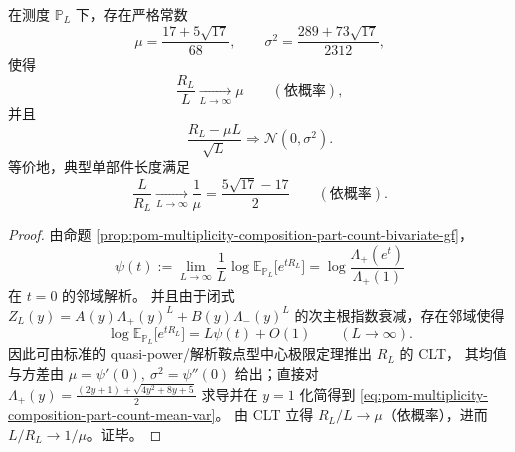 \begin{theorem}\label{thm:pom-multiplicity-composition-part-count-clt}
在测度 \(\mathbb{P}_L\) 下，存在严格常数
\begin{equation}\label{eq:pom-multiplicity-composition-part-count-mean-var}
\mu=\frac{17+5\sqrt{17}}{68},
\qquad
\sigma^2=\frac{289+73\sqrt{17}}{2312},
\end{equation}
使得
\[
\frac{R_L}{L}\xrightarrow[L\to\infty]{}\mu
\qquad(\text{依概率}),
\]
并且
\[
\frac{R_L-\mu L}{\sqrt{L}}\Longrightarrow \mathcal{N}(0,\sigma^2).
\]
等价地，典型单部件长度满足
\[
\frac{L}{R_L}\xrightarrow[L\to\infty]{}\frac{1}{\mu}=\frac{5\sqrt{17}-17}{2}
\qquad(\text{依概率}).
\]
\end{theorem}
\begin{proof}
由命题 \ref{prop:pom-multiplicity-composition-part-count-bivariate-gf}，
\[
\psi(t)
:=\lim_{L\to\infty}\frac1L\log \mathbb{E}_{\mathbb{P}_L}\!\bigl[e^{tR_L}\bigr]
=\log\frac{\Lambda_+(e^{t})}{\Lambda_+(1)}
\]
在 \(t=0\) 的邻域解析。
并且由于闭式
\(
Z_L(y)=A(y)\Lambda_+(y)^L+B(y)\Lambda_-(y)^L
\)
的次主根指数衰减，存在邻域使得
\[
\log \mathbb{E}_{\mathbb{P}_L}\!\bigl[e^{tR_L}\bigr]
=L\psi(t)+O(1)\qquad(L\to\infty).
\]
因此可由标准的 quasi-power/解析鞍点型中心极限定理推出 \(R_L\) 的 CLT，
其均值与方差由
\(
\mu=\psi'(0),\ \sigma^2=\psi''(0)
\)
给出；直接对
\(
\Lambda_+(y)=\frac{(2y+1)+\sqrt{4y^2+8y+5}}{2}
\)
求导并在 \(y=1\) 化简得到 \eqref{eq:pom-multiplicity-composition-part-count-mean-var}。
由 CLT 立得 \(R_L/L\to\mu\)（依概率），进而 \(L/R_L\to 1/\mu\)。证毕。
\end{proof}

